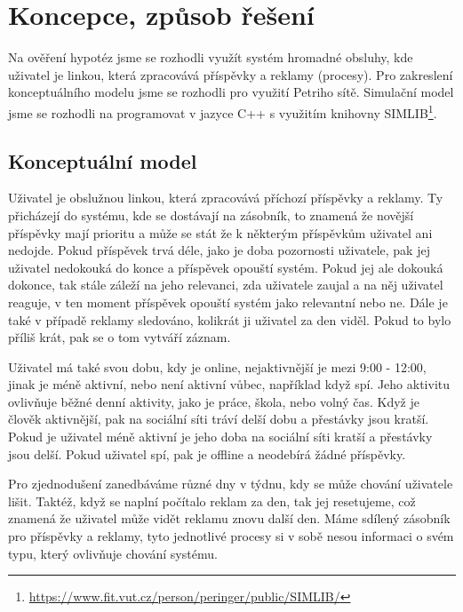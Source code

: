 \documentclass[11pt, a4paper]{article}
\begin{document}
\newpage
\section{Koncepce, způsob řešení}
Na ověření hypotéz jsme se rozhodli využít systém hromadné obsluhy, kde uživatel je linkou, která zpracovává příspěvky a reklamy (procesy).
Pro zakreslení konceptuálního modelu jsme se rozhodli pro využití Petriho sítě. Simulační model jsme se rozhodli na programovat v jazyce C++ s využitím knihovny SIMLIB\footnote{\href{https://www.fit.vut.cz/person/peringer/public/SIMLIB/}{https://www.fit.vut.cz/person/peringer/public/SIMLIB/}}.
\subsection{Konceptuální model}
Uživatel je obslužnou linkou, která zpracovává příchozí příspěvky a reklamy. Ty přicházejí do systému, kde se dostávají na zásobník,
to znamená že novější příspěvky mají prioritu a může se stát že k některým příspěvkům uživatel ani nedojde.
Pokud příspěvek trvá déle, jako je doba pozornosti uživatele, pak jej uživatel nedokouká do konce a příspěvek opouští systém.
Pokud jej ale dokouká dokonce, tak stále záleží na jeho relevanci, zda uživatele zaujal a na něj uživatel reaguje, v ten moment příspěvek opouští systém jako relevantní nebo ne.
Dále je také v případě reklamy sledováno, kolikrát ji uživatel za den viděl.
Pokud to bylo příliš krát, pak se o tom vytváří záznam.

Uživatel má také svou dobu, kdy je online, nejaktivnější je mezi 9:00 - 12:00, jinak je méně aktivní, nebo není aktivní vůbec, například když spí.
Jeho aktivitu ovlivňuje běžné denní aktivity, jako je práce, škola, nebo volný čas. Když je člověk aktivnější, pak na sociální síti tráví delší dobu a přestávky jsou kratší.
Pokud je uživatel méně aktivní je jeho doba na sociální síti kratší a přestávky jsou delší. Pokud uživatel spí, pak je offline a neodebírá žádné příspěvky.

Pro zjednodušení zanedbáváme různé dny v týdnu, kdy se může chování uživatele lišit. Taktéž, když se naplní počítalo reklam za den, tak jej resetujeme,
což znamená že uživatel může vidět reklamu znovu další den.
Máme sdílený zásobník pro příspěvky a reklamy, tyto jednotlivé procesy si v sobě nesou informaci o svém typu, který ovlivňuje chování systému.
\end{document}
